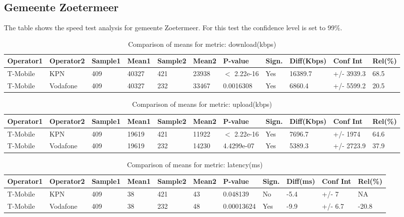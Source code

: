 \documentclass[]{article}
\begin{document}
\normalsize

\newpage

\subsection{Gemeente Zoetermeer}\label{gemeente-zoetermeer}

The table shows the speed test analysis for gemeente Zoetermeer. For
this test the confidence level is set to 99\%.

\begin{table}[ht]
\centering
{\footnotesize
\begin{tabular}{lllllllllll}
  \hline
Operator1 & Operator2 & Sample1 & Mean1 & Sample2 & Mean2 & P-value & Sign. & Diff(Kbps) & Conf Int & Rel(\%) \\ 
  \hline
T-Mobile & KPN & 409 & 40327 & 421 & 23938 & $<$ 2.22e-16 & Yes & 16389.7 & +/- 3939.3 & 68.5 \\ 
  T-Mobile & Vodafone & 409 & 40327 & 232 & 33467 & 0.0016308 & Yes & 6860.4 & +/- 5599.2 & 20.5 \\ 
   \hline
\end{tabular}
}
\caption{Comparison of means for metric: download(kbps)} 
\end{table}\begin{table}[ht]
\centering
{\footnotesize
\begin{tabular}{lllllllllll}
  \hline
Operator1 & Operator2 & Sample1 & Mean1 & Sample2 & Mean2 & P-value & Sign. & Diff(Kbps) & Conf Int & Rel(\%) \\ 
  \hline
T-Mobile & KPN & 409 & 19619 & 421 & 11922 & $<$ 2.22e-16 & Yes & 7696.7 & +/- 1974 & 64.6 \\ 
  T-Mobile & Vodafone & 409 & 19619 & 232 & 14230 & 4.4299e-07 & Yes & 5389.3 & +/- 2723.9 & 37.9 \\ 
   \hline
\end{tabular}
}
\caption{Comparison of means for metric: upload(kbps)} 
\end{table}\begin{table}[ht]
\centering
{\footnotesize
\begin{tabular}{lllllllllll}
  \hline
Operator1 & Operator2 & Sample1 & Mean1 & Sample2 & Mean2 & P-value & Sign. & Diff(ms) & Conf Int & Rel(\%) \\ 
  \hline
T-Mobile & KPN & 409 & 38 & 421 & 43 & 0.048139 & No & -5.4 & +/- 7 & NA \\ 
  T-Mobile & Vodafone & 409 & 38 & 232 & 48 & 0.00013624 & Yes & -9.9 & +/- 6.7 & -20.8 \\ 
   \hline
\end{tabular}
}
\caption{Comparison of means for metric: latency(ms)} 
\end{table}
\end{document}
